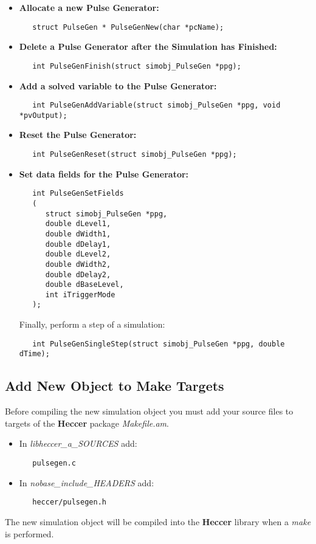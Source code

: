 \documentclass[12pt]{article}
\begin{document}
\begin{itemize}
\item {\bf Allocate a new Pulse Generator:}
\begin{verbatim}
   struct PulseGen * PulseGenNew(char *pcName);
\end{verbatim}

\item {\bf Delete a Pulse Generator after the Simulation has Finished:}
\begin{verbatim}
   int PulseGenFinish(struct simobj_PulseGen *ppg);
\end{verbatim}

\item {\bf Add a solved variable to the Pulse Generator:}
\begin{verbatim}
   int PulseGenAddVariable(struct simobj_PulseGen *ppg, void *pvOutput);
\end{verbatim}

\item {\bf Reset the Pulse Generator:}
\begin{verbatim}
   int PulseGenReset(struct simobj_PulseGen *ppg);
\end{verbatim}

\item{\bf Set data fields for the Pulse Generator:}
\begin{verbatim}
   int PulseGenSetFields
   (
      struct simobj_PulseGen *ppg,
      double dLevel1,
      double dWidth1,
      double dDelay1,
      double dLevel2,
      double dWidth2,
      double dDelay2,
      double dBaseLevel,
      int iTriggerMode
   );
\end{verbatim}
Finally, perform a step of a simulation:
\begin{verbatim}
   int PulseGenSingleStep(struct simobj_PulseGen *ppg, double dTime);
\end{verbatim}
\end{itemize}

\subsection*{Add New Object to Make Targets}

Before compiling the new simulation object you must add your source files to targets of the {\bf Heccer} package {\it Makefile.am}.

\begin{itemize}
   \item In {\it libheccer\_a\_SOURCES} add:
\begin{verbatim}
   pulsegen.c
\end{verbatim}
   \item In {\it nobase\_include\_HEADERS} add:
\begin{verbatim}
   heccer/pulsegen.h 
\end{verbatim}
\end{itemize}
The new simulation object will be compiled into the {\bf Heccer} library when a {\it make} is performed.
\end{document}
